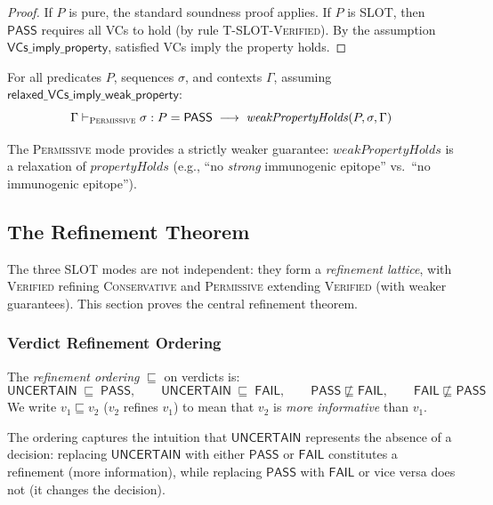 \documentclass[acmsmall,review,anonymous]{acmart}
\newcommand{\PASS}{\ensuremath{\mathsf{PASS}}\xspace}
\newcommand{\FAIL}{\ensuremath{\mathsf{FAIL}}\xspace}
\newcommand{\UNCERTAIN}{\ensuremath{\mathsf{UNCERTAIN}}\xspace}
\newcommand{\seq}{\sigma}
\newcommand{\pred}{P}
\newcommand{\verdict}{v}
\newcommand{\CONSERVATIVE}{\textsc{Conservative}\xspace}
\newcommand{\VERIFIED}{\textsc{Verified}\xspace}
\newcommand{\PERMISSIVE}{\textsc{Permissive}\xspace}
\newcommand{\evalmode}[4]{#1 \vdash_{#2} #3 : #4}
\begin{document}
\begin{proof}
If $\pred$ is pure, the standard soundness proof applies.
If $\pred$ is SLOT, then \PASS{} requires all VCs to hold (by rule
\textsc{T-SLOT-Verified}).
By the assumption $\textsf{VCs\_imply\_property}$, satisfied VCs
imply the property holds.
\end{proof}

\begin{theorem}[\PERMISSIVE{} Soundness]\label{thm:perm-sound}
For all predicates $\pred$, sequences $\seq$, and contexts $\Gamma$,
assuming $\textsf{relaxed\_VCs\_imply\_weak\_property}$:
\[
  \evalmode{\Gamma}{\PERMISSIVE}{\seq}{\pred} = \PASS
  \;\longrightarrow\;
  \mathit{weakPropertyHolds}(\pred, \seq, \Gamma)
\]
\end{theorem}

The \PERMISSIVE{} mode provides a strictly weaker guarantee:
$\mathit{weakPropertyHolds}$ is a relaxation of
$\mathit{propertyHolds}$ (e.g., ``no \emph{strong} immunogenic
epitope'' vs.\ ``no immunogenic epitope'').

\subsection{The Refinement Theorem}\label{sec:refinement}

The three SLOT modes are not independent: they form a \emph{refinement
lattice}, with \VERIFIED{} refining \CONSERVATIVE{} and \PERMISSIVE{}
extending \VERIFIED{} (with weaker guarantees).
This section proves the central refinement theorem.

\subsubsection{Verdict Refinement Ordering}

\begin{definition}
The \emph{refinement ordering} $\sqsubseteq$ on verdicts is:
\[
  \UNCERTAIN \;\sqsubseteq\; \PASS,
  \qquad
  \UNCERTAIN \;\sqsubseteq\; \FAIL,
  \qquad
  \PASS \not\sqsubseteq \FAIL,
  \qquad
  \FAIL \not\sqsubseteq \PASS
\]
We write $\verdict_1 \sqsubseteq \verdict_2$ ($\verdict_2$ refines
$\verdict_1$) to mean that $\verdict_2$ is \emph{more informative}
than $\verdict_1$.
\end{definition}

The ordering captures the intuition that \UNCERTAIN{} represents the
absence of a decision: replacing \UNCERTAIN{} with either \PASS{} or
\FAIL{} constitutes a refinement (more information), while replacing
\PASS{} with \FAIL{} or vice versa does not (it changes the decision).
\end{document}
